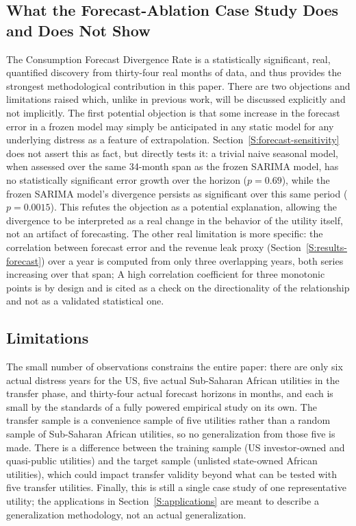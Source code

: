 \documentclass[final,1p,times]{elsarticle}
\begin{document}
\subsection{What the Forecast-Ablation Case Study Does and Does Not Show}

The Consumption Forecast Divergence Rate is a statistically significant, real, quantified discovery from thirty-four real months of data, and thus provides the strongest methodological contribution in this paper. There are two objections and limitations raised which, unlike in previous work, will be discussed explicitly and not implicitly. The first potential objection is that some increase in the forecast error in a frozen model may simply be anticipated in any static model for any underlying distress as a feature of extrapolation. Section~\ref{S:forecast-sensitivity} does not assert this as fact, but directly tests it: a trivial naive seasonal model, when assessed over the same 34-month span as the frozen SARIMA model, has no statistically significant error growth over the horizon ($p = 0.69$), while the frozen SARIMA model's divergence persists as significant over this same period ($p = 0.0015$). This refutes the objection as a potential explanation, allowing the divergence to be interpreted as a real change in the behavior of the utility itself, not an artifact of forecasting. The other real limitation is more specific: the correlation between forecast error and the revenue leak proxy (Section~\ref{S:results-forecast}) over a year is computed from only three overlapping years, both series increasing over that span; A high correlation coefficient for three monotonic points is by design and is cited as a check on the directionality of the relationship and not as a validated statistical one.

\subsection{Limitations}

The small number of observations constrains the entire paper: there are only six actual distress years for the US, five actual Sub-Saharan African utilities in the transfer phase, and thirty-four actual forecast horizons in months, and each is small by the standards of a fully powered empirical study on its own. The transfer sample is a convenience sample of five utilities rather than a random sample of Sub-Saharan African utilities, so no generalization from those five is made. There is a difference between the training sample (US investor-owned and quasi-public utilities) and the target sample (unlisted state-owned African utilities), which could impact transfer validity beyond what can be tested with five transfer utilities. Finally, this is still a single case study of one representative utility; the applications in Section~\ref{S:applications} are meant to describe a generalization methodology, not an actual generalization.
\end{document}
